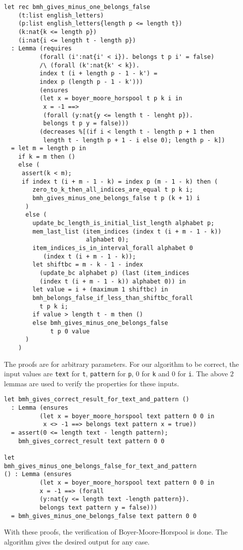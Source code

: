 \begin{verbatim}
let rec bmh_gives_minus_one_belongs_false
    (t:list english_letters) 
    (p:list english_letters{length p <= length t})
    (k:nat{k <= length p})
    (i:nat{i <= length t - length p})
  : Lemma (requires
          (forall (i':nat{i' < i}). belongs t p i' = false)
          /\ (forall (k':nat{k' < k}). 
          index t (i + length p - 1 - k') = 
          index p (length p - 1 - k')))
          (ensures 
          (let x = boyer_moore_horspool t p k i in 
           x = -1 ==> 
           (forall (y:nat{y <= length t - lenght p}).
           belongs t p y = false)))
          (decreases %[(if i < length t - length p + 1 then
           length t - length p + 1 - i else 0); length p - k])
  = let m = length p in
    if k = m then ()
    else (
     assert(k < m);
     if index t (i + m - 1 - k) = index p (m - 1 - k) then (
        zero_to_k_then_all_indices_are_equal t p k i;
        bmh_gives_minus_one_belongs_false t p (k + 1) i
      )
      else (
        update_bc_length_is_initial_list_length alphabet p;
        mem_last_list (item_indices (index t (i + m - 1 - k))
                       alphabet 0);
        item_indices_is_in_interval_forall alphabet 0
           (index t (i + m - 1 - k));
        let shiftbc = m - k - 1 - index 
          (update_bc alphabet p) (last (item_indices 
          (index t (i + m - 1 - k)) alphabet 0)) in
        let value = i + (maximum 1 shiftbc) in
        bmh_belongs_false_if_less_than_shiftbc_forall
          t p k i;
        if value > length t - m then ()
        else bmh_gives_minus_one_belongs_false 
             t p 0 value
      )
    )
\end{verbatim}

The proofs are for arbitrary parameters. For our algorithm to be correct, the input values are \texttt{text} for \texttt{t}, \texttt{pattern} for \texttt{p}, \(0\) for \texttt{k} and \(0\) for \texttt{i}. The above \(2\) lemmas are used to verify the properties for these inputs.

\begin{verbatim}
let bmh_gives_correct_result_for_text_and_pattern ()
  : Lemma (ensures 
          (let x = boyer_moore_horspool text pattern 0 0 in
           x <> -1 ==> belongs text pattern x = true))
  = assert(0 <= length text - length pattern);
    bmh_gives_correct_result text pattern 0 0

let 
bmh_gives_minus_one_belongs_false_for_text_and_pattern 
() : Lemma (ensures 
          (let x = boyer_moore_horspool text pattern 0 0 in
          x = -1 ==> (forall 
          (y:nat{y <= length text -length pattern}).
          belongs text pattern y = false)))
  = bmh_gives_minus_one_belongs_false text pattern 0 0
\end{verbatim}

With these proofs, the verification of Boyer-Moore-Horspool is done. The algorithm gives the desired output for any case.